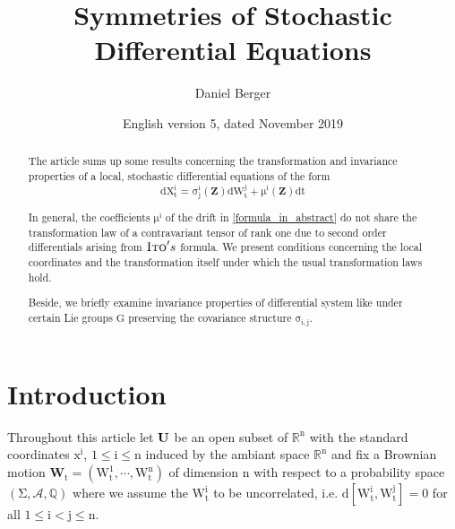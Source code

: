 \documentclass[10 pt,english]{smfart}
\title{Symmetries of Stochastic Differential Equations}
\date {English version 5, dated November 2019}
\author{Daniel Berger}
\newcommand{\G}{{\textrm{G}}}
\newcommand{\Z}{\mathrm{\mathbf{Z}}}
\newcommand{\Wt}{\mathrm{\mathbf{W}}_{t}}
\newcommand{\U}{{\bf{U}}}
\begin{document}
\def\smfbyname{}

\begin{abstract}
The article sums up some results concerning the transformation and invariance properties of a local, stochastic differential equations of the form
\begin{equation}\label{formula_in_abstract}
\mathrm{d X^{i}_{t}= \sigma^{i}_{j}(\Z)dW^{j}_{t}+\mu^{i}(\Z)dt}
\end{equation} 

In general, the coefficients $\mathrm{\mu^{i}}$ of the drift in \ref{formula_in_abstract} do not share the transformation law of a contravariant tensor of rank one due to second order differentials arising from $\textsc{Ito}'s$ formula. We present conditions concerning the local coordinates and the transformation itself under which the usual transformation laws hold.

Beside, we briefly examine invariance properties of differential system like under certain Lie groups $\mathrm{\G}$ preserving the covariance structure $\mathrm{\sigma_{i,j}}$. 
\end{abstract}


\maketitle

\tableofcontents

\section{Introduction}\label{introduction}
Throughout this article let $\mathrm{\U}$ be an open subset of $\mathrm{\mathbb{R}^{n}}$ with the standard coordinates $\mathrm{x^{i}}$, $\mathrm{1\leq i\leq n}$ induced by the ambiant space $\mathrm{\mathbb{R}^{n}}$ and fix a Brownian motion $\mathrm{\Wt=\left(W^{1}_{t},\cdots,W^{n}_{t}\right)}$ of dimension $\mathrm{n}$ with respect to a probability space $\mathrm{\left(\Sigma, \mathscr{A},\mathbb{Q}\right)}$ where we assume the $\mathrm{W^{i}_{t}}$ to be uncorrelated, i.e. $\mathrm{d[W^{i}_{t},W^{j}_{t}]}=0$ for all $\mathrm{1\leq i < j\leq n}$.
\end{document}
